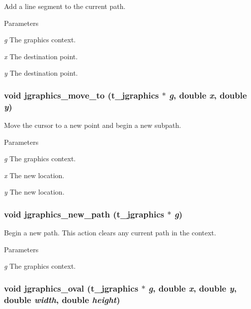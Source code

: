 Add a line segment to the current path. 
\begin{DoxyParams}{Parameters}
\item[{\em g}]The graphics context. \item[{\em x}]The destination point. \item[{\em y}]The destination point. \end{DoxyParams}
\hypertarget{group__jgraphics_ga52651cc3a7f9b395461eadffe9e6156b}{
\subsubsection[{jgraphics\_\-move\_\-to}]{\setlength{\rightskip}{0pt plus 5cm}void jgraphics\_\-move\_\-to ({\bf t\_\-jgraphics} $\ast$ {\em g}, \/  double {\em x}, \/  double {\em y})}}
\label{group__jgraphics_ga52651cc3a7f9b395461eadffe9e6156b}


Move the cursor to a new point and begin a new subpath. 
\begin{DoxyParams}{Parameters}
\item[{\em g}]The graphics context. \item[{\em x}]The new location. \item[{\em y}]The new location. \end{DoxyParams}
\hypertarget{group__jgraphics_ga627c4feb0dfcad9e8417472eec5aedef}{
\subsubsection[{jgraphics\_\-new\_\-path}]{\setlength{\rightskip}{0pt plus 5cm}void jgraphics\_\-new\_\-path ({\bf t\_\-jgraphics} $\ast$ {\em g})}}
\label{group__jgraphics_ga627c4feb0dfcad9e8417472eec5aedef}


Begin a new path. This action clears any current path in the context.


\begin{DoxyParams}{Parameters}
\item[{\em g}]The graphics context. \end{DoxyParams}
\hypertarget{group__jgraphics_gabdf52225c137e70eea1f955559d19591}{
\subsubsection[{jgraphics\_\-oval}]{\setlength{\rightskip}{0pt plus 5cm}void jgraphics\_\-oval ({\bf t\_\-jgraphics} $\ast$ {\em g}, \/  double {\em x}, \/  double {\em y}, \/  double {\em width}, \/  double {\em height})}}
\label{group__jgraphics_gabdf52225c137e70eea1f955559d19591}


